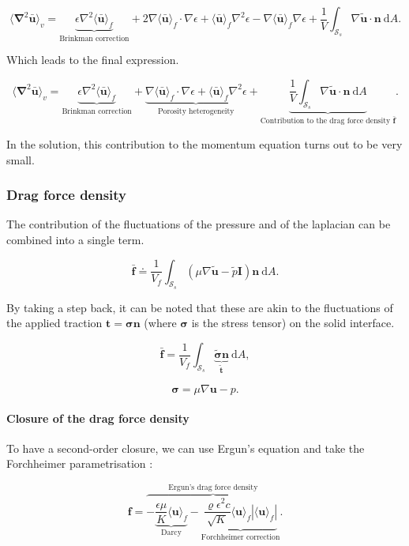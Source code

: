 \documentclass[a4paper,11pt]{article}
\begin{document}
$$\langle\bm\nabla^2\bm{\bar u}\rangle_v = \underbrace{\epsilon\nabla^2\langle\bm{\bar u}\rangle_f}_\text{Brinkman correction} + 2\nabla\langle\bm{\bar u}\rangle_f\cdot\nabla\epsilon + \langle\bm{\bar u}\rangle_f\nabla^2\epsilon - \nabla\langle \bm{\bar u}\rangle_f\nabla\epsilon + \frac{1}{V}\int_{\mathcal S_s}\nabla\tilde{\bm u}\cdot \bm n~\mathrm dA.$$

Which leads to the final expression.

$$\boxed{\langle\bm\nabla^2\bm{\bar u}\rangle_v = \underbrace{\epsilon\nabla^2\langle\bm{\bar u}\rangle_f}_\text{Brinkman correction} + \underbrace{\nabla\langle\bm{\bar u}\rangle_f\cdot\nabla\epsilon + \langle\bm{\bar u}\rangle_f\nabla^2\epsilon}_{\text{Porosity heterogeneity}} + \underbrace{\frac{1}{V}\int_{\mathcal S_s}\nabla\tilde{\bm u}\cdot \bm n~\mathrm dA}_{\text{Contribution to the drag force density }\bm{\bar f}}.}$$

In the solution, this contribution to the momentum equation turns out to be very small.

\subsubsection{Drag force density}

The contribution of the fluctuations of the pressure and of the laplacian can be combined into a single term.

$$\bm{\bar f} \doteq \frac{1}{V_f}\int_{\mathcal S_s}\left(\mu\nabla\tilde{\bm u} - \tilde p\bm I\right)\bm n~\mathrm dA.$$

By taking a step back, it can be noted that these are akin to the fluctuations of the applied traction ${\bm t=\bm\sigma\bm n}$ (where ${\bm\sigma}$ is the stress tensor) on the solid interface.

$$\bm{\bar f} = \frac{1}{V_f}\int_{\mathcal S_s}\underbrace{\tilde{\bm\sigma}\bm n}_{\tilde{\bm t}}~\mathrm dA,$$

$$\bm\sigma = \mu\nabla\bm u - p.$$

\paragraph{Closure of the drag force density}

To have a second-order closure, we can use Ergun's equation and take the Forchheimer parametrisation \citep{W1996}:

$$\bm{ f} = \overbrace{-\underbrace{\frac{\epsilon\mu}{K}\langle\bm u\rangle_f}_{\text{Darcy}} - \underbrace{\frac{\varrho\epsilon^2c}{\sqrt{K}}\langle\bm u\rangle_f\left|\langle\bm u\rangle_f\right|}_{\text{Forchheimer correction}}}^{\text{Ergun's drag force density}}.$$
\end{document}
